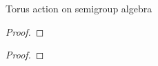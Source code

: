 \begin{definition}
  \label{torActOnAlg}
  Torus action on semigroup algebra
\end{definition}

\begin{lemma}
  \label{lmm:1.1.16}
\end{lemma}
\begin{proof}
\end{proof}

\begin{theorem}
  \label{thm:1.1.17}
\end{theorem}
\begin{proof}
\end{proof}
